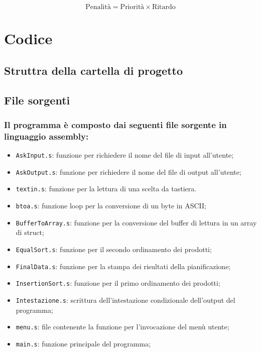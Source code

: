 \documentclass[a4paper]{report}
\begin{document}
\[
\text{Penalità} = \text{Priorità} \times \text{Ritardo}
\]

\newpage
\section{Codice}

\subsection{Struttra della cartella di progetto}


\subsection{File sorgenti}

\subsubsection{Il programma è composto dai seguenti file sorgente in linguaggio assembly:}
\begin{itemize}
  \item \texttt{AskInput.s}: funzione per richiedere il nome del file di input all'utente;
  \item \texttt{AskOutput.s}: funzione per richiedere il nome del file di output all'utente;
  \item \texttt{textin.s}: funzione per la lettura di una scelta da tastiera.
  \item \texttt{btoa.s}: funzione loop per la conversione di un byte in ASCII;
  \item \texttt{BufferToArray.s}: funzione per la conversione del buffer di lettura in un array di struct;
  \item \texttt{EqualSort.s}: funzione per il secondo ordinamento dei prodotti;
  \item \texttt{FinalData.s}: funzione per la stampa dei risultati della pianificazione;
  \item \texttt{InsertionSort.s}: funzione per il primo ordinamento dei prodotti;
  \item \texttt{Intestazione.s}: scrittura dell'intestazione condizionale dell'output del programma;
  \item \texttt{menu.s}: file contenente la funzione per l'invocazione del menù utente;
  \item \texttt{main.s}: funzione principale del programma;
\end{itemize}
\
\end{document}
